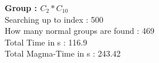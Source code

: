 \textbf{Group : $C_2*C_{10}$}\\
Searching up to index : 500\\
How many normal groups are found : 469\\
Total Time in s : 116.9\\
Total Magma-Time in s : 243.42\\
